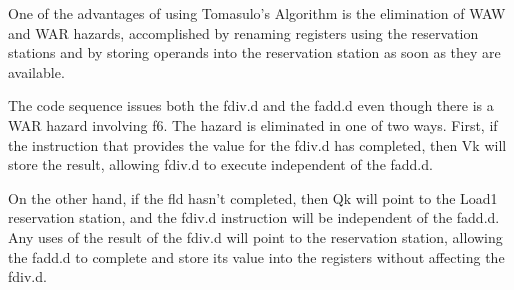     One of the advantages of using Tomasulo's Algorithm is the elimination of WAW and WAR hazards, accomplished by renaming registers using the reservation stations and by storing operands into the reservation station as soon as they are available.

    The code sequence issues both the fdiv.d and the fadd.d even though there is a WAR hazard involving f6. The hazard is eliminated in one of two ways. First, if the instruction that provides the value for the fdiv.d has completed, then Vk will store the result, allowing fdiv.d to execute independent of the fadd.d.

    On the other hand, if the fld hasn't completed, then Qk will point to the Load1 reservation station, and the fdiv.d instruction will be independent of the fadd.d. Any uses of the result of the fdiv.d will point to the reservation station, allowing the fadd.d to complete and store its value into the registers without affecting the fdiv.d.

